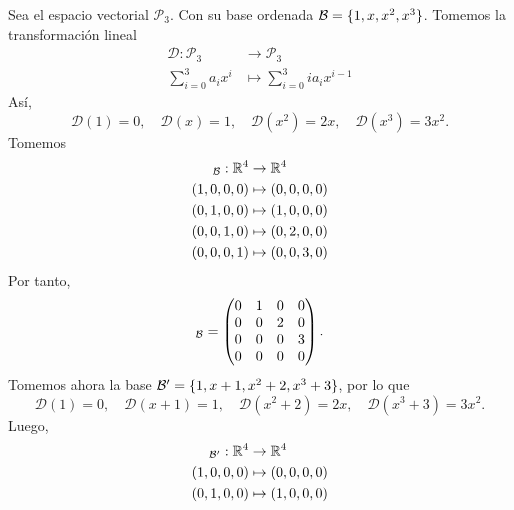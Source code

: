 \documentclass[12pt,a4paper]{book}
\newcommand{\llaves}[1]{\{#1\}}
\begin{document}
    \begin{ejemplo}
        Sea el espacio vectorial $\mathcal{P}_3$. Con su base ordenada $\BB = \llaves{1, x, x^2, x^3}$. Tomemos la transformación lineal
        \begin{align*}
            \mathcal{D} : \mathcal{P}_3 & \to \mathcal{P}_3\\
            \sum_{i = 0}^{3}a_ix^{i} & \mapsto \sum_{i = 0}^3ia_ix^{i - 1}
        \end{align*}
        Así,
        \begin{equation*}
            \mathcal{D}(1) = 0, \quad \mathcal{D}(x) = 1, \quad \mathcal{D}(x^2) = 2x, \quad \mathcal{D}(x^3) = 3x^2.
        \end{equation*}
        Tomemos
        \begin{align*}
            [\mathcal{D}]_{\BB}: \R^4 & \to \R^4\\
            (1, 0, 0, 0) & \mapsto (0, 0, 0, 0)\\
            (0, 1, 0, 0) & \mapsto (1, 0, 0, 0)\\
            (0, 0, 1, 0) & \mapsto (0, 2, 0, 0)\\
            (0, 0, 0, 1) & \mapsto (0, 0, 3, 0)\\
        \end{align*}
        Por tanto,
        \begin{equation*}
            [\mathcal{D}]_{\BB} = 
            \begin{pmatrix}
                0 & 1 & 0 & 0\\
                0 & 0 & 2 & 0\\
                0 & 0 & 0 & 3\\
                0 & 0 & 0 & 0
            \end{pmatrix}.
        \end{equation*}
        Tomemos ahora la base $\BB' = \llaves{1, x + 1, x^2 + 2, x^3 + 3}$, por lo que
        \begin{equation*}
            \mathcal{D}(1) = 0, \quad \mathcal{D}(x + 1) = 1, \quad \mathcal{D}(x^2 + 2) = 2x, \quad \mathcal{D}(x^3 + 3) = 3x^2.
        \end{equation*}
        Luego,
        \begin{align*}
            [\mathcal{D}]_{\BB'}: \R^4 & \to \R^4\\
            (1, 0, 0, 0) & \mapsto (0, 0, 0, 0)\\
            (0, 1, 0, 0) & \mapsto (1, 0, 0, 0)\\

\end{align*}
\end{ejemplo}
\end{document}
